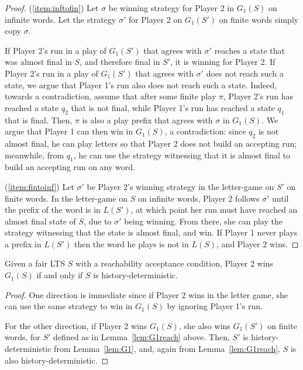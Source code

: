 \documentclass[10pt,a4paper]{amsart}
\theoremstyle{definition}
\numberwithin{equation}{section}
\newcommand{\strat}{\sigma}
\newcommand{\lts}{S}
\begin{document}
\begin{proof}
(\ref{item:inftofin}) Let $\strat$ be winning strategy for Player 2 in $G_1(\lts)$ on infinite words. Let the strategy $\strat'$ for Player 2 on $G_1(\lts')$ on finite words simply copy $\strat$.

If Player 2's run in a play of $G_1(\lts')$ that agrees with $\strat'$ reaches a state that was almost final in $\lts$, and therefore final in $\lts'$, it is winning for Player 2. If Player 2's run in a play of $G_1(\lts')$ that agrees with $\strat'$ does not reach such a state, we argue that Player 1's run also does not reach such a state. Indeed, towards a contradiction, assume that after some finite play $\pi$, Player 2's run has reached a state $q_2$ that is not final, while Player 1's run has reached a state $q_1$ that is final. Then, $\pi$ is also a play prefix that agrees with $\strat$ in $G_1(\lts)$. We argue that Player 1 can then win in $G_1(\lts)$, a contradiction: since $q_2$ is not almost final, he can play letters so that Player 2 does not build an accepting run; meanwhile, from $q_1$, he can use the strategy witnessing that it is almost final to build an accepting run on any word.

(\ref{item:fintoinf}) Let $\strat'$ be Player 2's winning strategy in the letter-game on $\lts'$ on finite words. In the letter-game on $\lts$ on infinite words, Player 2 follows $\strat'$ until the prefix of the word is in $L(\lts')$, at which point her run must have reached an almost final state of $\lts$, due to $\strat'$ being winning. From there, she can play the strategy witnessing that the state is almost final, and win.
If Player 1 never plays a prefix in $L(\lts')$ then the word he plays is not in $L(\lts)$, and Player 2 wins.
\end{proof}

\begin{theorem}
Given a fair LTS $\lts$ with a reachability acceptance condition, Player 2 wins $G_1(\lts)$ if and only if $\lts$ is history-deterministic. 
\end{theorem}

\begin{proof}
One direction is immediate since if Player 2 wins in the letter game, she can use the same strategy to win in $G_1(\lts)$ by ignoring Player 1's run.

For the other direction, if Player 2 wins $G_1(\lts)$, she also wins $G_1(\lts')$ on finite words, for $\lts'$ defined as in Lemma~\ref{lem:G1reach} above. Then, $\lts'$ is history-deterministic from Lemma~\ref{lem:G1}, and, again from Lemma~\ref{lem:G1reach}, $\lts$ is also history-deterministic.
\end{proof}
\end{document}
